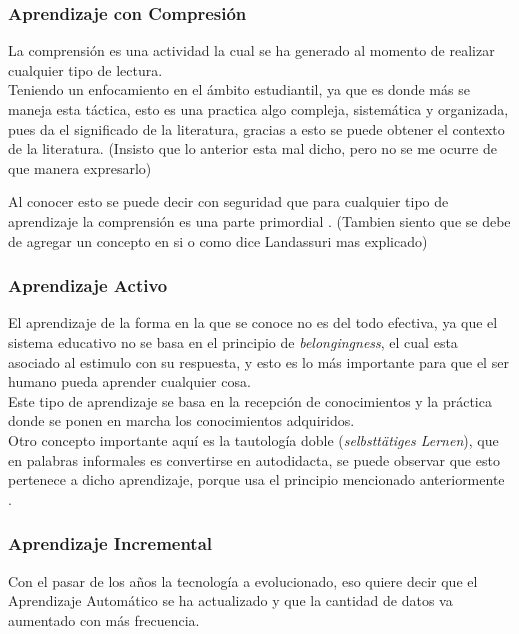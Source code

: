        \subsubsection{Aprendizaje con Compresi\'on}
            La comprensi\'on es una actividad la cual se ha generado al momento de realizar cualquier tipo de lectura.\\
            Teniendo un enfocamiento en el \'ambito estudiantil, ya que es donde m\'as se maneja esta t\'actica, esto es una
            practica algo compleja, sistemática y organizada, pues da el significado de la literatura, gracias a esto se puede
            obtener el contexto de la literatura.
            (Insisto que lo anterior esta mal dicho, pero no se me ocurre de que manera expresarlo)

            Al conocer esto se puede decir con seguridad que para cualquier tipo de aprendizaje la comprensi\'on es 
            una parte primordial \cite{perez2014}.
            (Tambien siento que se debe de agregar un concepto en si o como dice Landassuri mas explicado)

        \subsubsection{Aprendizaje Activo}
            El aprendizaje de la forma en la que se conoce no es del todo efectiva, ya que el sistema educativo
            no se basa en el principio de \textit{belongingness}, el cual esta asociado al estimulo con su respuesta,
            y esto es lo m\'as importante para que el ser humano pueda aprender cualquier cosa.\\
            Este tipo de aprendizaje se basa en la recepci\'on de conocimientos y la pr\'actica donde se ponen en marcha los conocimientos adquiridos.\\
            Otro concepto importante aqu\'i es la tautolog\'ia doble (\textit{selbstt\"atiges Lernen}), que en palabras informales es convertirse en autodidacta, 
            se puede observar que esto pertenece a dicho aprendizaje, porque usa el principio mencionado anteriormente \cite{Huber2008}.
   

 \subsubsection{Aprendizaje Incremental}
        Con el pasar de los años la tecnología a evolucionado, eso quiere decir que el Aprendizaje Automático se ha actualizado y que la 
        cantidad de datos va aumentado con más frecuencia.
        
